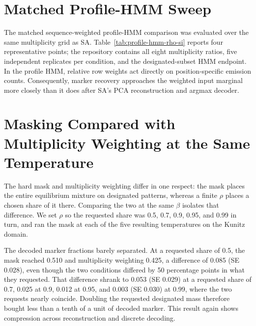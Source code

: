 \section{Matched Profile-HMM Sweep}
The matched sequence-weighted profile-HMM comparison was evaluated over the same multiplicity
grid as SA. Table~\ref{tab:profile-hmm-rho-si} reports four representative points; the
repository contains all eight multiplicity ratios, five independent replicates per condition,
and the designated-subset HMM endpoint. In the profile HMM, relative row weights act directly
on position-specific emission counts. Consequently, marker recovery approaches the weighted
input marginal more closely than it does after SA's PCA reconstruction and argmax decoder.

\begin{table}[p]
  \centering
  \caption{Matched SA and sequence-weighted profile-HMM benchmark across representative
  multiplicity ratios. Both methods use the same cleaned alignments, designation labels, and
  relative multiplicity ratio. Marker values are mean $\pm$ s.d. across five replicates of
  620 sequences; $D$ is mean pairwise sequence diversity.}
  \label{tab:profile-hmm-rho-si}
  \scriptsize
\end{table}
\FloatBarrier

\section{Masking Compared with Multiplicity Weighting at the Same Temperature}
\label{app:matched-beta}
The hard mask and multiplicity weighting differ in one respect: the mask places the entire
equilibrium mixture on designated patterns, whereas a finite $\rho$ places a chosen share of it
there. Comparing the two at the same $\beta$ isolates that difference. We set $\rho$ so the
requested share was 0.5, 0.7, 0.9, 0.95, and 0.99 in turn, and ran the mask at each of the five
resulting temperatures on the Kunitz domain.

The decoded marker fractions barely separated. At a requested share of 0.5, the mask reached
0.510 and multiplicity weighting 0.425, a difference of 0.085 (SE 0.028), even though the two
conditions differed by 50 percentage points in what they requested. That difference shrank to
0.053 (SE 0.029) at a requested share of 0.7, 0.025 at 0.9, 0.012 at 0.95, and 0.003
(SE 0.030) at 0.99, where the two requests nearly coincide. Doubling the requested designated
mass therefore bought less than a tenth of a unit of decoded marker. This result
again shows compression across reconstruction and discrete decoding.

